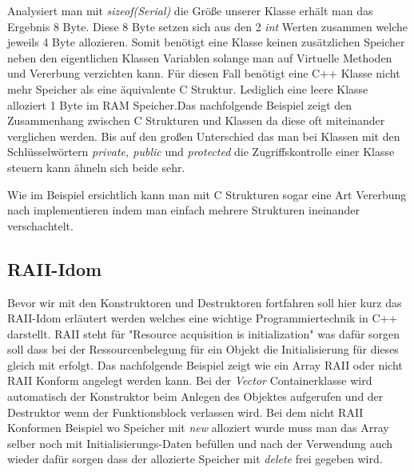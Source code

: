 \documentclass[MES,Master,ngerman]{twbook}%
\begin{document}
Analysiert man mit \textit{sizeof(Serial)} die Größe unserer Klasse erhält man das Ergebnis 8 Byte. Diese 8 Byte setzen sich aus den 2 \textit{int} Werten zusammen welche jeweils 4 Byte allozieren. Somit benötigt eine Klasse keinen zusätzlichen Speicher neben den eigentlichen Klassen Variablen solange man auf Virtuelle Methoden und Vererbung verzichten kann. Für diesen Fall benötigt eine C++ Klasse nicht mehr Speicher als eine äquivalente C Struktur. Lediglich eine leere Klasse alloziert 1 Byte im RAM Speicher.\newpage Das nachfolgende Beispiel zeigt den Zusammenhang zwischen C Strukturen und Klassen da diese oft miteinander verglichen werden. Bis auf den großen Unterschied das man bei Klassen mit den Schlüsselwörtern \textit{private, public} und \textit{protected} die Zugriffskontrolle einer Klasse steuern kann ähneln sich beide sehr.

\begin{figure}[!htb]
	\begin{subfigure}[b]{0.5\textwidth}
		
		\label{fig:21}
	\end{subfigure}
	\begin{subfigure}[b]{0.5\textwidth}
		
		\label{fig:22}
	\end{subfigure}
\end{figure}

Wie im Beispiel ersichtlich kann man mit C Strukturen sogar eine Art Vererbung nach implementieren indem man einfach mehrere Strukturen ineinander verschachtelt.

\subsection{RAII-Idom}
Bevor wir mit den Konstruktoren und Destruktoren fortfahren soll hier kurz das RAII-Idom erläutert werden welches eine wichtige Programmiertechnik in C++ darstellt. RAII steht für "Resource acquisition is initialization" \space  was dafür sorgen soll dass bei der Ressourcenbelegung für ein Objekt die Initialisierung für dieses gleich mit erfolgt. Das nachfolgende Beispiel zeigt wie ein Array RAII oder nicht RAII Konform angelegt werden kann. Bei der \textit{Vector} Containerklasse wird automatisch der Konstruktor beim Anlegen des Objektes aufgerufen und der Destruktor wenn der Funktionsblock verlassen wird. Bei dem nicht RAII Konformen Beispiel wo Speicher mit \textit{new} alloziert wurde muss man das Array selber noch mit Initialisierungs-Daten befüllen und nach der Verwendung auch wieder dafür sorgen dass der allozierte Speicher mit \textit{delete} frei gegeben wird.
\end{document}
